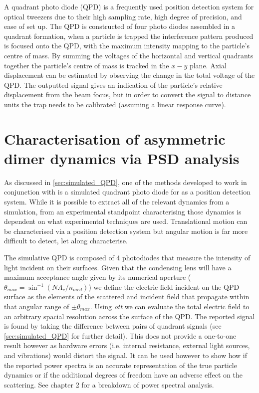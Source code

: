 A quadrant photo diode (QPD) is a frequently used position detection 
system for optical tweezers due to their high sampling rate, high 
degree of precision, and ease of set up. The QPD is constructed of 
four photo diodes assembled in a quadrant formation, when a particle 
is trapped the interference pattern produced is focused onto the QPD, 
with the maximum intensity mapping to the particle's centre of mass. 
By summing the voltages of the horizontal and vertical quadrants together 
the particle's centre of mass is tracked in the $x-y$ plane. Axial 
displacement can be estimated by observing the change in the total 
voltage of the QPD. The outputted signal gives an indication of the 
particle's relative displacement from the beam focus, but in order to 
convert the signal to distance units the trap needs to be calibrated 
(assuming a linear response curve).

\section{Characterisation of asymmetric dimer dynamics via PSD analysis}
As discussed in \ref{sec:simulated_QPD}, one of the methods 
developed to work in conjunction with \cite{Vigilante2020} 
is a simulated quadrant photo diode for as a position 
detection system. While it is possible to extract all of 
the relevant dynamics from a simulation, from an experimental
standpoint characterising those dynamics is dependent on what
experimental techniques are used. Translational motion can be
characterised via a position detection system but angular 
motion is far more difficult to detect, let along characterise. 

The simulative QPD is composed of 4 photodiodes that measure the 
intensity of light incident on their surfaces. Given that the 
condensing lens will have a maximum acceptance angle given by 
its numerical aperture ($\theta_{max} = \sin^{-1}\left(NA_c/n_
{med}\right)$) we define the electric field incident on the QPD 
surface as the elements of the scattered and incident field that 
propagate within that angular range of $\pm \theta_{max}$. Using 
\textit{ott} we can evaluate the total electric field to an 
arbitrary spacial resolution across the surface of the QPD. The 
reported signal is found by taking the difference between pairs 
of quadrant signals (see \ref{sec:simulated_QPD} for further 
detail). This does not provide a one-to-one result however as 
hardware errors (i.e. internal resistance, external light sources, 
and vibrations) would distort the signal. It can be used however to 
show how if the reported power spectra is an accurate representation 
of the true particle dynamics or if the additional degrees of freedom 
have an adverse effect on the scattering. See chapter 2 for a breakdown
of power spectral analysis. 

